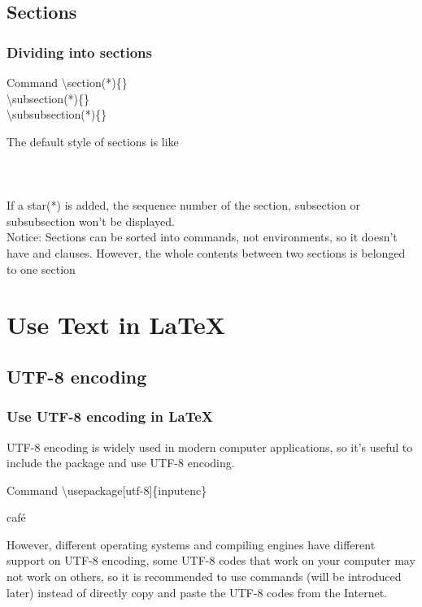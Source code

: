 \documentclass{beamer}
\newenvironment{command}{\begin{block}{Command}}{\end{block}}
\begin{document}
\subsection{Sections}

\begin{frame}
	\frametitle{Dividing into sections}
	\begin{command}
		\alert{\textbackslash section(*)}\{\}\\
		\alert{\textbackslash subsection(*)}\{\}\\
		\alert{\textbackslash subsubsection(*)}\{\}\\
	\end{command}
	The default style of sections is like\\
	\\
	\\
	\\[0.5em]
	If a star(\alert{*}) is added, the sequence number of the section, subsection or subsubsection won't be displayed.\\
	\alert{Notice:} Sections can be sorted into commands, not environments, so it doesn't have  and  clauses. However, the whole contents between two sections is belonged to one section
\end{frame}

\section{Use Text in \LaTeX}
\begin{frame}
\end{frame}

\subsection{UTF-8 encoding}

\begin{frame}
	\frametitle{Use UTF-8 encoding in \LaTeX}
	UTF-8 encoding is widely used in modern computer applications, so it's useful to include the  package and use UTF-8 encoding.
	\begin{command}
		\alert{\textbackslash usepackage}[utf-8]\{inputenc\}
	\end{command}
	\begin{example}
		café
	\end{example}
	However, different operating systems and compiling engines have different support on UTF-8 encoding, some UTF-8 codes that work on your computer may not work on others, so it is recommended to use commands (will be introduced later) instead of directly copy and paste the UTF-8 codes from the Internet.
\end{frame}
\end{document}
